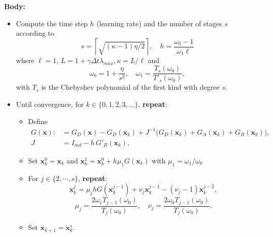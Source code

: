 \documentclass[10pt,a4paper]{article}
\begin{document}
\begin{algorithm}
\textbf{Body:} 
\begin{itemize}
  \item Compute the time step $h$ (learning rate) and the number of stages $s$ according to 
  \[
  s=\left\lceil\sqrt{(\kappa-1)\eta/2}\right\rceil,\quad h=\frac{\omega_0-1}{\omega_1\ell}
  \]
  where $\ell=1$, $L=1+\gamma \Delta t \lambda_{max},\kappa=L/\ell$ and
\[
\omega_{0}=1+\frac{\eta}{s^{2}}, \quad \omega_{1}
=\frac{T_{s}(\omega_{0})}{T'_{s}(\omega_{0})},
\]
with $T_s$ is the Chebyshev polynomial of the first kind with degree $s$. 
\item Until convergence, for $k\in \{0,1,2,3,\ldots\}$, \textbf{repeat}:
\begin{itemize}
\item Define 
\begin{align*}
G({\boldsymbol{x}}):&=G_D({\boldsymbol{x}}) - G_D({\boldsymbol{x}}_k)
+ J^{-1}\!\bigl(G_D({\boldsymbol{x}}_k)+G_A({\boldsymbol{x}}_k)+G_R({\boldsymbol{x}}_k)\bigr),
\\
J &= I_{md} - h\, G'_R({\boldsymbol{x}}_k),
\end{align*}
\item Set ${\boldsymbol{x}}_k^0 = {\boldsymbol{x}}_k$ and ${\boldsymbol{x}}_k^1 = {\boldsymbol{x}}_k^0+ h\mu_1 G({\boldsymbol{x}}_k)$ with $\mu_1 = \omega_1/ \omega_0$
\item For $j\in \{2,\cdots,s\}$, \textbf{repeat}:
$${\boldsymbol{x}}_k^j = \mu_j h G({\boldsymbol{x}}_k^{j-1}) + \nu_j {\boldsymbol{x}}_{k}^{j-1}-(\nu_j-1) {\boldsymbol{x}}_{k}^{j-2},$$ 
\begin{equation} \label{eq:rkcd_iter}
\mu_j = \frac{2\omega_1 T_{j-1}(\omega_0)}{T_j(\omega_0)},
\quad \nu_j = \frac{2\omega_0 T_{j-1}(\omega_0)}{T_j(\omega_0)}.
\end{equation}
\item Set ${\boldsymbol{x}}_{k+1}={\boldsymbol{x}}_{k}^s$. 
\end{itemize}
\end{itemize}


\end{algorithm}
\end{document}
